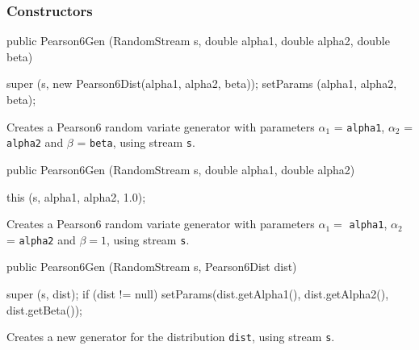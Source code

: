 \subsubsection* {Constructors}
\begin{code}

   public Pearson6Gen (RandomStream s, double alpha1, double alpha2,
                                       double beta) \begin{hide} {
      super (s, new Pearson6Dist(alpha1, alpha2, beta));
      setParams (alpha1, alpha2, beta);
   }\end{hide}
\end{code} 
\begin{tabb} Creates a Pearson6 random variate generator with parameters
  $\alpha_1$ = \texttt{alpha1}, $\alpha_2$ = \texttt{alpha2} and $\beta$ =
  \texttt{beta}, using stream \texttt{s}. 
\end{tabb}
\begin{code}

   public Pearson6Gen (RandomStream s, double alpha1, double alpha2) \begin{hide} {
      this (s, alpha1, alpha2, 1.0);
   }\end{hide}
\end{code} 
\begin{tabb} Creates a Pearson6 random variate generator with parameters
  $\alpha_1 =$ \texttt{alpha1}, $\alpha_2$ = \texttt{alpha2} and $\beta=1$,
    using stream \texttt{s}. 
\end{tabb}
\begin{code}

   public Pearson6Gen (RandomStream s, Pearson6Dist dist) \begin{hide} {
      super (s, dist);
      if (dist != null)
         setParams(dist.getAlpha1(), dist.getAlpha2(), dist.getBeta());
   }\end{hide}
\end{code}
  \begin{tabb} Creates a new generator for the distribution \texttt{dist},
     using stream \texttt{s}.
  \end{tabb}

